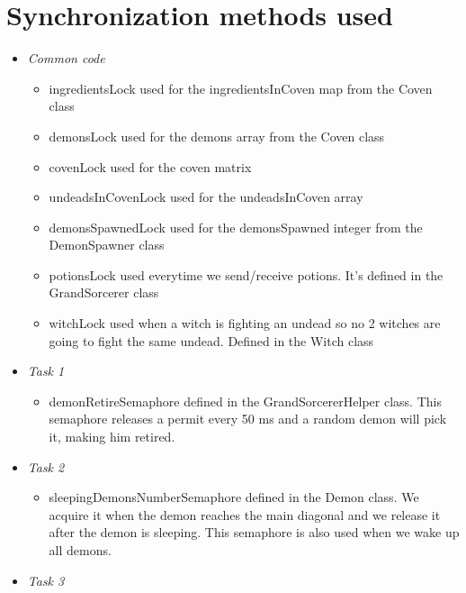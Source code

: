 \documentclass[14pt]{article}
\begin{document}
\section*{Synchronization methods used}
\vspace{5 mm}
\begin{itemize}
            \item \textit{Common code}\\
            \begin{itemize}
                \item ingredientsLock used for the ingredientsInCoven map from the Coven class
                \item demonsLock used for the demons array from the Coven class
                \item covenLock used for the coven matrix
                \item undeadsInCovenLock used for the undeadsInCoven array
                \item demonsSpawnedLock used for the demonsSpawned integer from the DemonSpawner class
                \item potionsLock used everytime we send/receive potions. It's defined in the GrandSorcerer class
                \item witchLock used when a witch is fighting an undead so no 2 witches are going to fight the same undead. Defined in the Witch class
            \end{itemize}
            \item \textit{Task 1}\\
            \begin{itemize}
                \item demonRetireSemaphore defined in the GrandSorcererHelper class. This semaphore releases a permit every 50 ms and a random demon will pick it, making him retired.
            \end{itemize}
            \item \textit{Task 2}\\
            \begin{itemize}
                \item sleepingDemonsNumberSemaphore defined in the Demon class. We acquire it when the demon reaches the main diagonal and we release it after the demon is sleeping. This semaphore is also used when we wake up all demons. 
            \end{itemize}
            \item \textit{Task 3}\\

\end{itemize}
\end{document}
